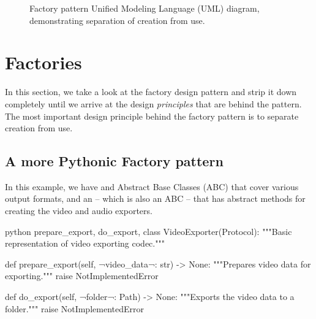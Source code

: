 \begin{figure}[H]
{
	}
	\caption[UML diagram]{Factory pattern Unified Modeling Language (UML) diagram, demonstrating separation of creation from use.}
\end{figure}



\section{Factories}

In this section, we take a look at the factory design pattern and strip it down completely until we arrive at the design \emph{principles} that are behind the pattern. The most important design principle behind the factory pattern is to separate creation from use.



\subsection{A more Pythonic Factory pattern}


In this example, we have  and  Abstract Base Classes (ABC) that cover various output formats, and an  -- which is also an ABC -- that has abstract methods for creating the video and audio exporters.

\begin{monokai}{python}{
	prepare_export,
	do_export,
}
  class VideoExporter(Protocol):
      """Basic representation of video exporting codec."""
       
      def prepare_export(self, ¬video_data¬: str) -> None:
          """Prepares video data for exporting."""
          raise NotImplementedError
       
      def do_export(self, ¬folder¬: Path) -> None:
          """Exports the video data to a folder."""
          raise NotImplementedError
\end{monokai}


